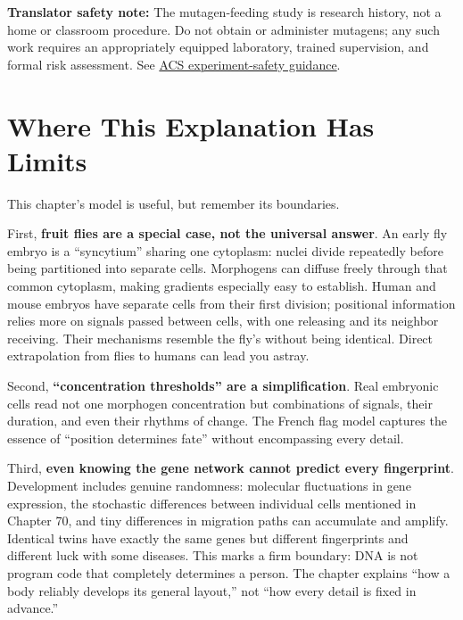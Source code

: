 \textbf{Translator safety note:} The mutagen-feeding study is research history, not a home or classroom procedure. Do not obtain or administer mutagens; any such work requires an appropriately equipped laboratory, trained supervision, and formal risk assessment. See \href{https://institute.acs.org/acs-center/lab-safety/education-training/safer-experiments.html}{ACS experiment-safety guidance}.

\section{Where This Explanation Has Limits}

This chapter's model is useful, but remember its boundaries.

First, \textbf{fruit flies are a special case, not the universal answer}. An early fly embryo is a ``syncytium'' sharing one cytoplasm: nuclei divide repeatedly before being partitioned into separate cells. Morphogens can diffuse freely through that common cytoplasm, making gradients especially easy to establish. Human and mouse embryos have separate cells from their first division; positional information relies more on signals passed between cells, with one releasing and its neighbor receiving. Their mechanisms resemble the fly's without being identical. Direct extrapolation from flies to humans can lead you astray.

Second, \textbf{``concentration thresholds'' are a simplification}. Real embryonic cells read not one morphogen concentration but combinations of signals, their duration, and even their rhythms of change. The French flag model captures the essence of ``position determines fate'' without encompassing every detail.

Third, \textbf{even knowing the gene network cannot predict every fingerprint}. Development includes genuine randomness: molecular fluctuations in gene expression, the stochastic differences between individual cells mentioned in Chapter 70, and tiny differences in migration paths can accumulate and amplify. Identical twins have exactly the same genes but different fingerprints and different luck with some diseases. This marks a firm boundary: DNA is not program code that completely determines a person. The chapter explains ``how a body reliably develops its general layout,'' not ``how every detail is fixed in advance.''

